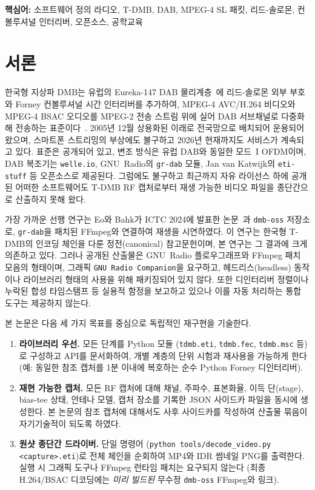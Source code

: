 \documentclass[11pt,a4paper]{article}
\begin{document}
\noindent\textbf{핵심어:} 소프트웨어 정의 라디오, T-DMB, DAB, MPEG-4 SL 패킷,
리드-솔로몬, 컨볼루셔널 인터리버, 오픈소스, 공학교육

\section{서론}\label{sec:intro}

한국형 지상파 DMB는 유럽의 Eureka-147 DAB 물리계층~\cite{etsi300401}에
리드-솔로몬 외부 부호와 Forney 컨볼루셔널 시간 인터리버를 추가하여,
MPEG-4 AVC/H.264 비디오와 MPEG-4 BSAC 오디오를 MPEG-2 전송 스트림 위에
실어 DAB 서브채널로 다중화해 전송하는 표준이다~\cite{ttak0026,etsi102427,etsi102428}.
2005년 12월 상용화된 이래로 전국망으로 배치되어 운용되어 왔으며, 스마트폰
스트리밍의 부상에도 불구하고 2026년 현재까지도 서비스가 계속되고 있다.
표준은 공개되어 있고, 변조 방식은 유럽 DAB와 동일한 모드~I OFDM이며,
DAB 복조기는 \texttt{welle.io}, GNU~Radio의 \texttt{gr-dab} 모듈,
Jan van Katwijk의 \texttt{eti-stuff} 등 오픈소스로 제공된다.  그럼에도
불구하고 최근까지 자유 라이선스 하에 공개된 어떠한 소프트웨어도 T-DMB
RF 캡처로부터 재생 가능한 비디오 파일을 종단간으로 산출하지 못해 왔다.

가장 가까운 선행 연구는 Eo와 Bahk가 ICTC 2024에 발표한
논문~\cite{eo2024tdmb}과 \texttt{dmb-oss} 저장소로, \texttt{gr-dab}을
패치된 FFmpeg와 연결하여 재생을 시연하였다.  이 연구는 한국형 T-DMB의
인코딩 체인을 다룬 정전(canonical) 참고문헌이며, 본 연구는 그 결과에
크게 의존하고 있다.  그러나 공개된 산출물은 GNU~Radio 플로우그래프와
FFmpeg 패치 모음의 형태이며, 그래픽 \texttt{GNU~Radio Companion}을
요구하고, 헤드리스(headless) 동작이나 라이브러리 형태의 사용을 위해
패키징되어 있지 않다.  또한 디인터리버 정렬이나 누락된 합성 타임스탬프
등 실용적 함정을 보고하고 있으나 이를 자동 처리하는 통합 도구는 제공하지
않는다.

본 논문은 다음 세 가지 목표를 중심으로 독립적인 재구현을 기술한다.

\begin{enumerate}[leftmargin=*,nosep]
\item \textbf{라이브러리 우선.}  모든 단계를 Python 모듈
       (\texttt{tdmb.eti}, \texttt{tdmb.fec}, \texttt{tdmb.msc} 등)로
       구성하고 API를 문서화하여, 개별 계층의 단위 시험과 재사용을 가능하게
       한다 (예: 동일한 참조 캡처를 1분 이내에 복호하는 순수 Python
       Forney 디인터리버).
\item \textbf{재현 가능한 캡처.}  모든 RF 캡처에 대해 채널, 주파수, 표본화율,
       이득 단(stage), bias-tee 상태, 안테나 모델, 캡처 장소를 기록한 JSON
       사이드카 파일을 동시에 생성한다.  본 논문의 참조 캡처에 대해서도
       사후 사이드카를 작성하여 산출물 묶음이 자기기술적이 되도록 하였다.
\item \textbf{원샷 종단간 드라이버.}  단일 명령어
       (\texttt{python tools/decode\_video.py <capture>.eti})로 전체 체인을
       순회하여 MP4와 IDR 썸네일 PNG를 출력한다.  실행 시 그래픽 도구나
       FFmpeg 런타임 패치는 요구되지 않는다 (최종 H.264/BSAC 디코딩에는
       \emph{미리 빌드된} 무수정 \texttt{dmb-oss} FFmpeg와 링크).
\end{enumerate}
\end{document}

